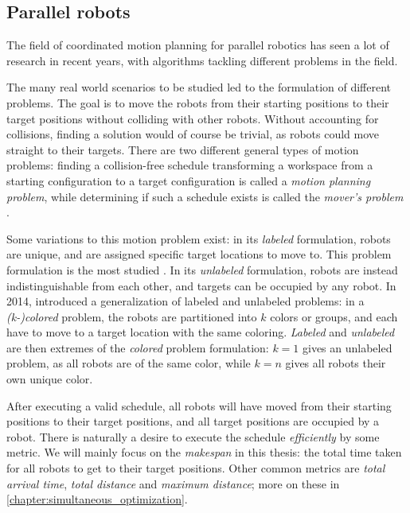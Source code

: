 \subsection{Parallel robots}

The field of coordinated motion planning for parallel robotics has seen a lot of research in recent years, with algorithms tackling different problems in the field.


The many real world scenarios to be studied led to the formulation of different problems.
The goal is to move the robots from their starting positions to their target positions without colliding with other robots.
Without accounting for collisions, finding a solution would of course be trivial, as robots could move straight to their targets.
There are two different general types of motion problems: finding a collision-free schedule transforming a workspace from a starting configuration to a target configuration is called a \emph{motion planning problem}, while determining if such a schedule exists is called the \emph{mover's problem} \cite{siamcomp/HopcroftW86}.

Some variations to this motion problem exist: in its \emph{labeled} formulation, robots are unique, and are assigned specific target locations to move to.
This problem formulation is the most studied \cite{fun/BrockenHKLS21}.
In its \emph{unlabeled} formulation, robots are instead indistinguishable from each other, and targets can be occupied by any robot.
In 2014, \cite{ijrr/SoloveyH14} introduced a generalization of labeled and unlabeled problems: in a \emph{(k-)colored} problem, the robots are partitioned into $k$ colors or groups, and each have to move to a target location with the same coloring.
\emph{Labeled} and \emph{unlabeled} are then extremes of the \emph{colored} problem formulation: $k=1$ gives an unlabeled problem, as all robots are of the same color, while $k=n$ gives all robots their own unique color.

After executing a valid schedule, all robots will have moved from their starting positions to their target positions, and all target positions are occupied by a robot.
There is naturally a desire to execute the schedule \emph{efficiently} by some metric.
We will mainly focus on the \emph{makespan} in this thesis: the total time taken for all robots to get to their target positions.
Other common metrics are \emph{total arrival time}, \emph{total distance} and \emph{maximum distance}; more on these in \cref{chapter:simultaneous_optimization}. 

